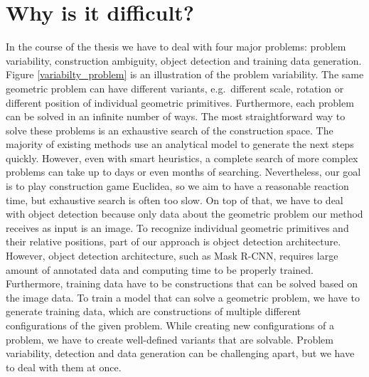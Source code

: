 \section{Why is it difficult?}
In the course of the thesis we have to deal with four major problems: problem variability, construction ambiguity, object detection and training data generation. Figure \ref{variabilty_problem} is an illustration of the problem variability. The same geometric problem can have different variants, e.g.~different scale, rotation or different position of individual geometric primitives. Furthermore, each problem can be solved in an infinite number of ways. The most straightforward way to solve these problems is an exhaustive search of the construction space. The majority of existing methods use an analytical model to generate the next steps quickly. However, even with smart heuristics, a complete search of more complex problems can take up to days or even months of searching. Nevertheless, our goal is to play construction game Euclidea, so we aim to have a reasonable reaction time, but exhaustive search is often too slow.
\newline \newline
On top of that, we have to deal with object detection because only data about the geometric problem our method receives as input is an image. To recognize individual geometric primitives and their relative positions, part of our approach is object detection architecture. However, object detection architecture, such as Mask {R-CNN}, requires large amount of annotated data and computing time to be properly trained. Furthermore, training data have to be constructions that can be solved based on the image data. To train a model that can solve a geometric problem, we have to generate training data, which are constructions of multiple different configurations of the given problem. While creating new configurations of a problem, we have to create well-defined variants that are solvable. Problem variability, detection and data generation can be challenging apart, but we have to deal with them at once.
